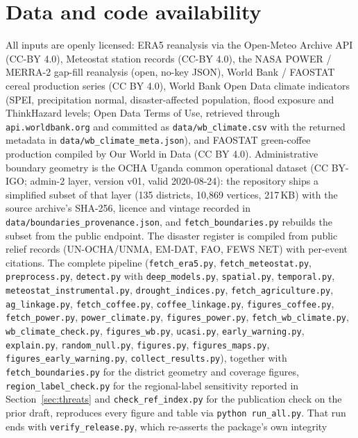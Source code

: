 \documentclass[preprint,12pt]{elsarticle}
\begin{document}
\section*{Data and code availability}
All inputs are openly licensed: ERA5 reanalysis via the Open-Meteo Archive API
(CC-BY 4.0), Meteostat station records (CC-BY 4.0), the NASA POWER / MERRA-2
gap-fill reanalysis (open, no-key JSON), World Bank / FAOSTAT
cereal production series (CC BY 4.0), World Bank Open Data climate indicators
(SPEI, precipitation normal, disaster-affected population, flood exposure and
ThinkHazard levels; Open Data Terms of Use, retrieved through
\texttt{api.worldbank.org} and committed as \texttt{data/wb\_climate.csv} with
the returned metadata in \texttt{data/wb\_climate\_meta.json}), and FAOSTAT
green-coffee production
compiled by Our World in Data (CC BY 4.0). Administrative boundary geometry is
the OCHA Uganda common operational dataset \cite{uchacod2020} (CC BY-IGO;
admin-2 layer, version v01, valid 2020-08-24): the repository ships a simplified
subset of that layer (135 districts, 10{,}869 vertices, 217\,KB) with the source
archive's SHA-256, licence and vintage recorded in
\texttt{data/boundaries\_provenance.json}, and \texttt{fetch\_boundaries.py}
rebuilds the subset from the public endpoint. The disaster register is
compiled from public relief records (UN-OCHA/UNMA, EM-DAT, FAO, FEWS NET) with
per-event citations. The complete pipeline (\texttt{fetch\_era5.py},
\texttt{fetch\_meteostat.py}, \texttt{preprocess.py}, \texttt{detect.py} with
\texttt{deep\_models.py},
\texttt{spatial.py}, \texttt{temporal.py},
\texttt{meteostat\_instrumental.py}, \texttt{drought\_indices.py},
\texttt{fetch\_agriculture.py}, \texttt{ag\_linkage.py}, \texttt{fetch\_coffee.py},
\texttt{coffee\_linkage.py}, \texttt{figures\_coffee.py},
\texttt{fetch\_power.py}, \texttt{power\_climate.py}, \texttt{figures\_power.py},
\texttt{fetch\_wb\_climate.py}, \texttt{wb\_climate\_check.py},
\texttt{figures\_wb.py},
\texttt{ucasi.py}, \texttt{early\_warning.py}, \texttt{explain.py},
\texttt{random\_null.py},
\texttt{figures.py}, \texttt{figures\_maps.py},
\texttt{figures\_early\_warning.py}, \texttt{collect\_results.py}),
together with \texttt{fetch\_boundaries.py} for the district geometry and
coverage figures, \texttt{region\_label\_check.py} for the regional-label
sensitivity reported in Section~\ref{sec:threats} and
\texttt{check\_ref_index.py} for the publication check on the prior draft,
reproduces every figure and table via \texttt{python run\_all.py}. That run ends
with \texttt{verify\_release.py}, which re-asserts the package's own integrity
\end{document}
